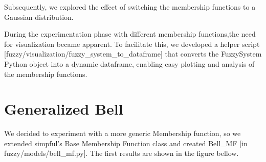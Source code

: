 \documentclass[11pt]{report}
\begin{document}
Subsequently, we explored the effect of switching the membership functions to a Gaussian distribution.

\begin{figure}[h]
\centering
\end{figure}

During the experimentation phase with different membership functions,the need for visualization became apparent.
To facilitate this, we developed a helper script [fuzzy/visualization/fuzzy\_system\_to\_dataframe] that converts the
FuzzySystem Python object into a dynamic dataframe, enabling easy plotting and analysis of the membership functions.



\section{Generalized Bell}
We decided to experiment with a more generic Membership function, so we
extended simpful's Base Membership Function class and created Bell\_MF [in fuzzy/models/bell\_mf.py].
The first results are shown in the figure bellow.
\end{document}

